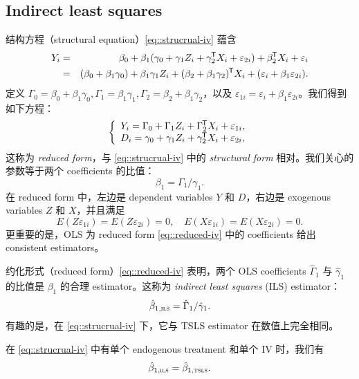 \subsection{Indirect least squares}


结构方程（structural equation）\cref{eq::strucrual-iv} 蕴含
\begin{eqnarray*}
Y_i &=&\beta_0 + \beta_1 (\gamma_0 + \gamma_1 Z_i + \gamma_2 ^{\mkern-1.5mu\mathsf{T}} X_i + \varepsilon_{2i}) + \beta_2^{\mkern-1.5mu\mathsf{T}} X_i + \varepsilon_{i} \\
&=& (\beta_0 + \beta_1\gamma_0 ) + \beta_1  \gamma_1 Z_i  + ( \beta_2 + \beta_1 \gamma_2 )^{\mkern-1.5mu\mathsf{T}} X_i  + ( \varepsilon_{i} + \beta_1 \varepsilon_{2i} ).
\end{eqnarray*}
定义 $\Gamma_0 = \beta_0 + \beta_1\gamma_0, \Gamma_1  =  \beta_1  \gamma_1, \Gamma_2 = \beta_2 + \beta_1 \gamma_2$，以及 $\varepsilon_{1i} = \varepsilon_{i} + \beta_1 \varepsilon_{2i}$。我们得到如下方程：
\begin{eqnarray}
\label{eq::reduced-iv}
\left\{
\begin{array}{l}
Y_i =\Gamma_0 + \Gamma_1 Z_i + \Gamma_2^{\mkern-1.5mu\mathsf{T}} X_i + \varepsilon_{1i},\\
D_i = \gamma_0 + \gamma_1 Z_i + \gamma_2 ^{\mkern-1.5mu\mathsf{T}} X_i + \varepsilon_{2i},
\end{array}
\right.
\end{eqnarray}
这称为 {\it reduced form}，与 \cref{eq::strucrual-iv} 中的 {\it structural form} 相对。我们关心的参数等于两个 coefficients 的比值：
$$
\beta_1 = \Gamma_1 / \gamma_1.
$$ 
在 reduced form 中，左边是 dependent variables $Y$ 和 $D$，右边是 exogenous variables $Z$ 和 $X$，并且满足
$$
E( Z \varepsilon_{1i} ) = E( Z \varepsilon_{2i} )  = 0, \quad 
E( X \varepsilon_{1i} ) = E( X \varepsilon_{2i} )  = 0.
$$ 
更重要的是，OLS 为 reduced form \cref{eq::reduced-iv} 中的 coefficients 给出 consistent estimators。 


约化形式（reduced form）\cref{eq::reduced-iv} 表明，两个 OLS coefficients $\hat{\Gamma}_1$ 与 $\hat{\gamma}_1$ 的比值是 $\beta_1$ 的合理 estimator。这称为 {\it indirect least squares} (ILS) estimator：
$$
\hat{\beta}_{1,\textsc{ils}} =  \hat{\Gamma}_1 / \hat{\gamma}_1 .
$$
有趣的是，在 \cref{eq::strucrual-iv} 下，它与 TSLS estimator 在数值上完全相同。

\begin{theorem}
\label{thm::ils=2sls}
在 \cref{eq::strucrual-iv} 中有单个 endogenous treatment 和单个 IV 时，我们有
$$
\hat{\beta}_{1,\textsc{ils}}   = \hat{\beta}_{1,\textsc{tsls}} . 
$$
\end{theorem}

